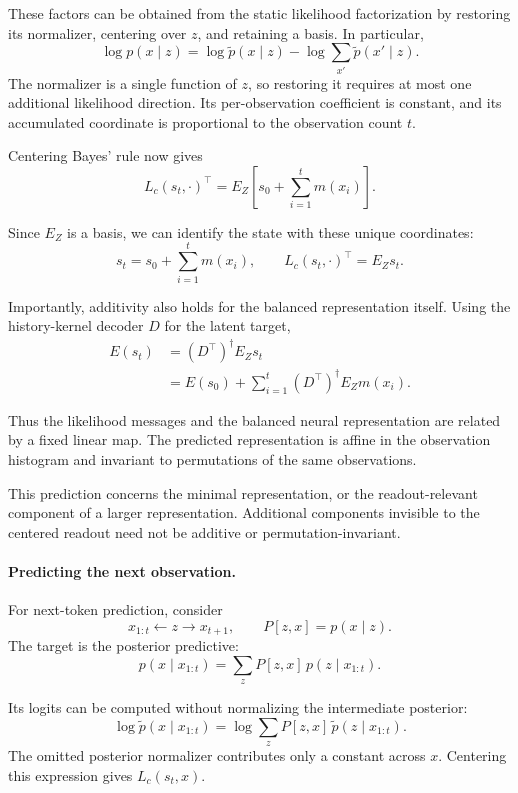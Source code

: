 These factors can be obtained from the static likelihood factorization by restoring its normalizer, centering over $z$, and retaining a basis. In particular,
\[
\log p(x\mid z)
=
\log\tilde p(x\mid z)
-
\log\sum_{x'}\tilde p(x'\mid z).
\]
The normalizer is a single function of $z$, so restoring it requires at most one additional likelihood direction. Its per-observation coefficient is constant, and its accumulated coordinate is proportional to the observation count $t$.

Centering Bayes' rule now gives
\[
L_c(s_t,\cdot)^\top
=
E_Z\left[s_0+\sum_{i=1}^t m(x_i)\right].
\]

Since $E_Z$ is a basis, we can identify the state with these unique coordinates:
\[
\boxed{
s_t=s_0+\sum_{i=1}^t m(x_i),
\qquad
L_c(s_t,\cdot)^\top=E_Zs_t.
}
\]

Importantly, additivity also holds for the balanced representation itself. Using the history-kernel decoder $D$ for the latent target,
\[
\begin{aligned}
E(s_t)
&=
(D^\top)^\dagger E_Zs_t\\
&=
E(s_0)
+
\sum_{i=1}^t
(D^\top)^\dagger E_Zm(x_i).
\end{aligned}
\]

Thus the likelihood messages and the balanced neural representation are related by a fixed linear map. The predicted representation is affine in the observation histogram and invariant to permutations of the same observations.

This prediction concerns the minimal representation, or the readout-relevant component of a larger representation. Additional components invisible to the centered readout need not be additive or permutation-invariant.

\paragraph{Predicting the next observation.}

For next-token prediction, consider
\[
x_{1:t}\leftarrow z\rightarrow x_{t+1},
\qquad
P[z,x]=p(x\mid z).
\]
The target is the posterior predictive:
\[
p(x\mid x_{1:t})
=
\sum_z P[z,x]\,p(z\mid x_{1:t}).
\]

Its logits can be computed without normalizing the intermediate posterior:
\[
\boxed{
\log\tilde p(x\mid x_{1:t})
=
\log\sum_z
P[z,x]\,\tilde p(z\mid x_{1:t}).
}
\]
The omitted posterior normalizer contributes only a constant across $x$. Centering this expression gives $L_c(s_t,x)$.

